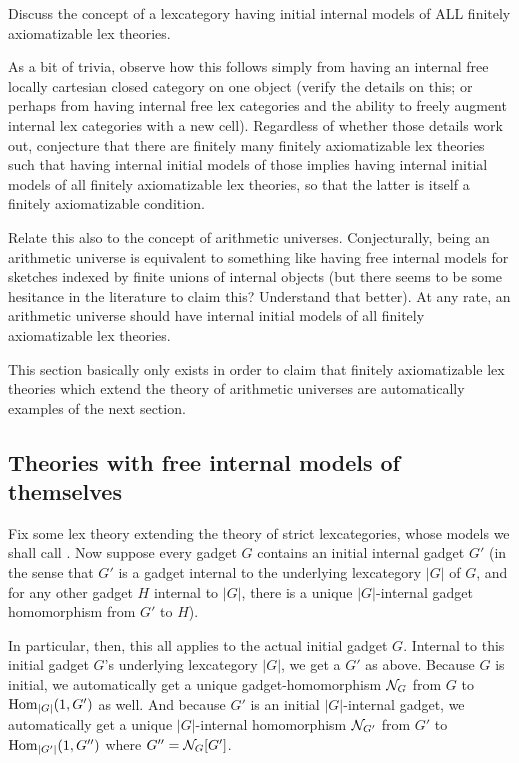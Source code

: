 \begin{TODOblock}
Discuss the concept of a lexcategory having initial internal models of ALL finitely axiomatizable lex theories.

As a bit of trivia, observe how this follows simply from having an internal free locally cartesian closed category on one object (verify the details on this; or perhaps from having internal free lex categories and the ability to freely augment internal lex categories with a new cell). Regardless of whether those details work out, conjecture that there are finitely many finitely axiomatizable lex theories such that having internal initial models of those implies having internal initial models of all finitely axiomatizable lex theories, so that the latter is itself a finitely axiomatizable condition.

Relate this also to the concept of arithmetic universes. Conjecturally, being an arithmetic universe is equivalent to something like having free internal models for sketches indexed by finite unions of internal objects (but there seems to be some hesitance in the literature to claim this? Understand that better). At any rate, an arithmetic universe should have internal initial models of all finitely axiomatizable lex theories.

This section basically only exists in order to claim that finitely axiomatizable lex theories which extend the theory of arithmetic universes are automatically examples of the next section.
\end{TODOblock}

\subsection{Theories with free internal models of themselves}
Fix some lex theory extending the theory of strict lexcategories, whose models we shall call . Now suppose every gadget $G$ contains an initial internal gadget $G'$ (in the sense that $G'$ is a gadget internal to the underlying lexcategory $|G|$ of $G$, and for any other gadget $H$ internal to $|G|$, there is a unique $|G|$-internal gadget homomorphism from $G'$ to $H$).

In particular, then, this all applies to the actual initial gadget $G$. Internal to this initial gadget $G$'s underlying lexcategory $|G|$, we get a $G'$ as above. Because $G$ is initial, we automatically get a unique gadget-homomorphism $\mathcal{N}_{G}$ from $G$ to $\operatorname{Hom}_{|G|}(1, G')$ as well. And because $G'$ is an initial $|G|$-internal gadget, we automatically get a unique $|G|$-internal homomorphism $\mathcal{N}_{G'}$ from $G'$ to $\operatorname{Hom}_{|G'|}(1, G'')$ where $G'' = \mathcal{N}_{G}[G']$.

